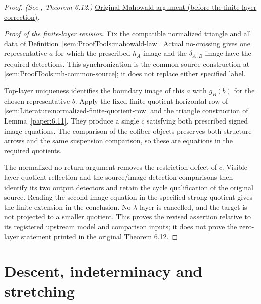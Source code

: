 \begin{proof}
\textit{(See \cite{LWX126}, Theorem 6.12.)} \href{paper/main.tex.html#L1860}{Original Mahowald argument (before the finite-layer correction)}.

\textit{Proof of the finite-layer revision.} Fix the compatible normalized triangle and all data of Definition~\ref{sem:ProofTools:mahowald-law}. Actual no-crossing gives one representative $a$ for which the prescribed $h_A$ image and the $\delta_{A,B}$ image have the required detections. This synchronization is the common-source construction at \ref{sem:ProofTools:mh-common-source}; it does not replace either specified label.

Top-layer uniqueness identifies the boundary image of this $a$ with $g_B(b)$ for the chosen representative $b$. Apply the fixed finite-quotient horizontal row of \ref{sem:Literature:normalized-finite-quotient-row} and the triangle construction of Lemma~\ref{paper:6.11}. They produce a single $c$ satisfying both prescribed signed image equations. The comparison of the cofiber objects preserves both structure arrows and the same suspension comparison, so these are equations in the required quotients.

The normalized no-return argument removes the restriction defect of $c$. Visible-layer quotient reflection and the source/image detection comparisons then identify its two output detectors and retain the cycle qualification of the original source. Reading the second image equation in the specified strong quotient gives the finite extension in the conclusion. No $\lambda$ layer is cancelled, and the target is not projected to a smaller quotient. This proves the revised assertion relative to its registered upstream model and comparison inputs; it does not prove the zero-layer statement printed in the original Theorem 6.12.
\end{proof}

\section{Descent, indeterminacy and stretching}

